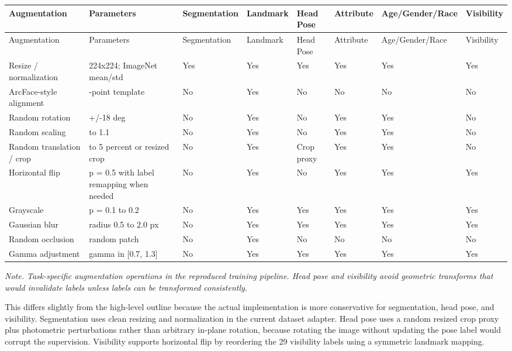 \documentclass[11pt]{article}
\begin{document}
\begingroup
\scriptsize
\setlength{\tabcolsep}{3pt}
\begin{longtable}{@{}>{\RaggedRight\arraybackslash}p{}>{\RaggedRight\arraybackslash}p{}>{\RaggedRight\arraybackslash}p{}>{\RaggedRight\arraybackslash}p{}>{\RaggedRight\arraybackslash}p{}>{\RaggedRight\arraybackslash}p{}>{\RaggedRight\arraybackslash}p{}>{\RaggedRight\arraybackslash}p{}@{}}
\toprule
Augmentation & Parameters & Segmentation & Landmark & Head Pose & Attribute & Age/Gender/Race & Visibility \\
\midrule
\endfirsthead
\toprule
Augmentation & Parameters & Segmentation & Landmark & Head Pose & Attribute & Age/Gender/Race & Visibility \\
\midrule
\endhead
Resize / normalization & 224x224; ImageNet mean/std & Yes & Yes & Yes & Yes & Yes & Yes \\
ArcFace-style alignment & 5-point template & No & Yes & No & No & No & No \\
Random rotation & +/-18 deg & No & Yes & No & Yes & Yes & No \\
Random scaling & 0.9 to 1.1 & No & Yes & No & Yes & Yes & No \\
Random translation / crop & 1 to 5 percent or resized crop & No & Yes & Crop proxy & Yes & Yes & No \\
Horizontal flip & p = 0.5 with label remapping when needed & No & Yes & No & Yes & Yes & Yes \\
Grayscale & p = 0.1 to 0.2 & No & Yes & Yes & Yes & Yes & Yes \\
Gaussian blur & radius 0.5 to 2.0 px & No & Yes & Yes & Yes & Yes & Yes \\
Random occlusion & random patch & No & Yes & No & No & No & No \\
Gamma adjustment & gamma in [0.7, 1.3] & No & Yes & Yes & Yes & Yes & Yes \\
\bottomrule
\end{longtable}
\endgroup


\emph{Note. Task-specific augmentation operations in the reproduced training pipeline. Head pose and visibility avoid geometric transforms that would invalidate labels unless labels can be transformed consistently.}

This differs slightly from the high-level outline because the actual implementation is more conservative for segmentation, head pose, and visibility. Segmentation uses clean resizing and normalization in the current dataset adapter. Head pose uses a random resized crop proxy plus photometric perturbations rather than arbitrary in-plane rotation, because rotating the image without updating the pose label would corrupt the supervision. Visibility supports horizontal flip by reordering the 29 visibility labels using a symmetric landmark mapping.
\end{document}
